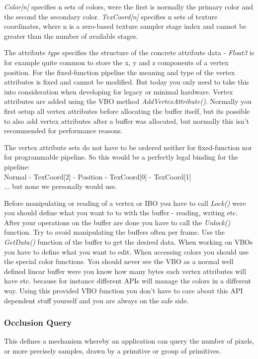 \emph{Color[n]} specifies n sets of colors, were the first is normally the primary color and the second the secondary color. \emph{TexCoord[n]} specifies n sets of texture coordinates, where n is a zero-based texture sampler stage index and cannot be greater than the number of available stages.

The attribute \emph{type} specifies the structure of the concrete attribute data - \emph{Float3} is for example quite common to store the x, y and z components of a vertex position. For the fixed-function pipeline the meaning and type of the vertex attributes is fixed and cannot be modified. But today you only need to take this into consideration when developing for legacy or minimal hardware. Vertex attributes are added using the \ac{VBO} method \emph{AddVertexAttribute()}. Normally you first setup all vertex attributes before allocating the buffer itself, but its possible to also add vertex attributes after a buffer was allocated, but normally this isn't recommended for performance reasons.

The vertex attribute sets do not have to be ordered neither for fixed-function nor for programmable pipeline. So this would be a perfectly legal binding for the pipeline:\\
Normal - TexCoord[2] - Position - TexCoord[0] - TexCoord[1]\\
... but none we personally would use.

Before manipulating or reading of a vertex or \ac{IBO} you have to call \emph{Lock()} were you should define what you want to to with the buffer - reading, writing etc. After your operations on the buffer are done you have to call the \emph{Unlock()} function. Try to avoid manipulating the buffers often per frame. Use the \emph{GetData()} function of the buffer to get the desired data. When working on \ac{VBO}s you have to define what you want to edit. When accessing colors you should use the special color functions. You should never see the \ac{VBO} as a normal well defined linear buffer were you know how many bytes each vertex attributes will have etc. because for instance different \ac{API}s will manage the colors in a different way. Using this provided \ac{VBO} function you don't have to care about this \ac{API} dependent stuff yourself and you are always on the safe side.



\subsubsection{Occlusion Query}
This defines a mechanism whereby an application can query the number of pixels, or more precisely samples, drawn by a primitive or group of primitives.

